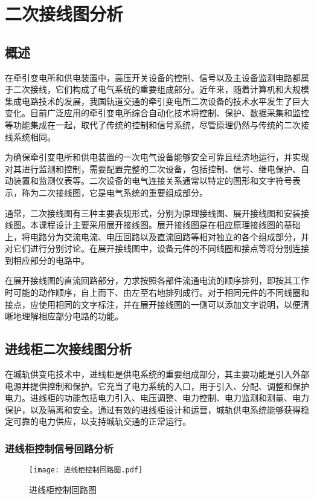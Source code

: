 \chapter{二次接线图分析}
\section{概述}
在牵引变电所和供电装置中，高压开关设备的控制、信号以及主设备监测电路都属于二次接线，它们构成了电气系统的重要组成部分。近年来，随着计算机和大规模集成电路技术的发展，我国轨道交通的牵引变电所二次设备的技术水平发生了巨大变化。目前广泛应用的牵引变电所综合自动化技术将控制、保护、数据采集和监控等功能集成在一起，取代了传统的控制和信号系统，尽管原理仍然与传统的二次接线系统相同。

为确保牵引变电所和供电装置的一次电气设备能够安全可靠且经济地运行，并实现对其进行监测和控制，需要配置完整的二次设备，包括控制、信号、继电保护、自动装置和监测仪表等。二次设备的电气连接关系通常以特定的图形和文字符号表示，称为二次接线图，它是电气系统的重要组成部分。

通常，二次接线图有三种主要表现形式，分别为原理接线图、展开接线图和安装接线图。本课程设计主要采用展开接线图。展开接线图是在相应原理接线图的基础上，将电路分为交流电流、电压回路以及直流回路等相对独立的各个组成部分，并对它们进行分别讨论。在展开接线图中，设备元件的不同线圈和接点等将分别连接到相应部分的电路中。

在展开接线图的直流回路部分，力求按照各部件流通电流的顺序排列，即按其工作时可能的动作顺序，自上而下、由左至右地排列成行。对于相同元件的不同线圈和接点，应使用相同的文字标注，并在展开接线图的一侧可以添加文字说明，以便清晰地理解相应部分电路的功能。

\section{进线柜二次接线图分析}

在城轨供变电技术中，进线柜是供电系统的重要组成部分，其主要功能是引入外部电源并提供控制和保护。它充当了电力系统的入口，用于引入、分配、调整和保护电力。进线柜的功能包括电力引入、电压调整、电力控制、电力监测和测量、电力保护，以及隔离和安全。通过有效的进线柜设计和运营，城轨供电系统能够获得稳定可靠的电力供应，以支持城轨交通的正常运行。

\subsection{进线柜控制信号回路分析}

\begin{figure}[!h]
	\centering
	\texttt{[image: 进线柜控制回路图.pdf]}
	\caption{进线柜控制回路图}
	\label{进线柜控制回路图}
\end{figure}

